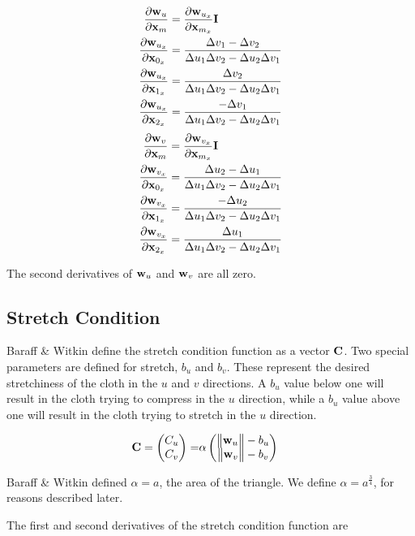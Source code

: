 \documentclass[twocolumn]{article}
\newcommand{\norm}[1]{\begin{Vmatrix}#1\end{Vmatrix}}
\newcommand{\pfrac}[2]{
    \frac{\partial #1}{\partial #2}
}
\newcommand{\I}{{\bf I}}
\newcommand{\x}{{\bf x}}
\newcommand{\du}{\Delta u}
\newcommand{\dv}{\Delta v}
\newcommand{\C}{{\bf C}}
\newcommand{\Cu}{C_u}
\newcommand{\Cv}{C_v}
\newcommand{\w}{{\bf w}}
\newcommand{\wu}{\w_u}
\newcommand{\wux}{\w_{u_x}}
\newcommand{\wv}{\w_v}
\newcommand{\wvx}{\w_{v_x}}
\begin{document}
\begin{align}
%
\pfrac{\wu}{\x_m} &= \pfrac{\wux}{\x_{m_x}} \I \\
%
\pfrac{\wux}{\x_{0_x}} &= \frac{\dv_1 - \dv_2}{\du_1\dv_2 - \du_2\dv_1} \\
%
\pfrac{\wux}{\x_{1_x}} &= \frac{\dv_2}{\du_1\dv_2 - \du_2\dv_1} \\
%
\pfrac{\wux}{\x_{2_x}} &= \frac{-\dv_1}{\du_1\dv_2 - \du_2\dv_1}
\end{align}
\begin{align}
%
\pfrac{\wv}{\x_m} &= \pfrac{\wvx}{\x_{m_x}} \I \\
%
\pfrac{\wvx}{\x_{0_x}} &= \frac{\du_2 - \du_1}{\du_1\dv_2 - \du_2\dv_1} \\
%
\pfrac{\wvx}{\x_{1_x}} &= \frac{-\du_2}{\du_1\dv_2 - \du_2\dv_1} \\
%
\pfrac{\wvx}{\x_{2_x}} &= \frac{\du_1}{\du_1\dv_2 - \du_2\dv_1}
\end{align}

The second derivatives of $\wu$ and $\wv$ are all zero.

\subsection{Stretch Condition}

Baraff \& Witkin define the stretch condition function as a vector $\C$.
Two special parameters are defined for stretch, $b_u$ and $b_v$. These
represent the desired stretchiness of the cloth in the $u$ and $v$ directions.
A $b_u$ value below one will result in the cloth trying to compress in the $u$
direction, while a $b_u$ value above one will result in the cloth trying to
stretch in the $u$ direction.

\begin{align}
%
\C = \begin{pmatrix} \Cu \\ \Cv \end{pmatrix} = &\alpha \begin{pmatrix}
       \norm{\wu} - b_u \\
       \norm{\wv} - b_v
   \end{pmatrix}
\end{align}

Baraff \& Witkin defined $\alpha=a$, the area of the triangle. We define
$\alpha=a^\frac{3}{4}$, for reasons described later.

The first and second derivatives of the stretch condition function are
\end{document}
